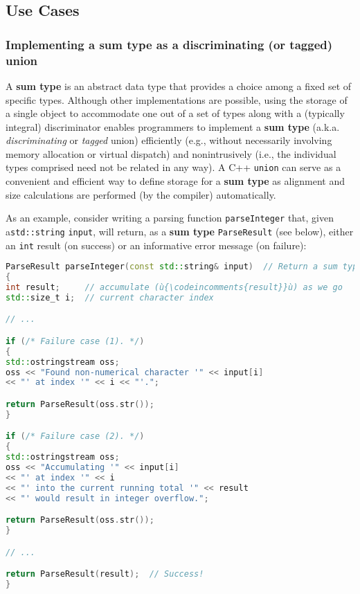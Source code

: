 \subsection[Use Cases]{Use Cases}\label{unrestrictedunion-use-cases}

\subsubsection[Implementing a \textbf{sum type}\glossary{sum type} as a discriminating (or tagged) \tt{union}]{Implementing a \textbf{sum type} as a discriminating (or tagged) {\ParaCode union}}\label{implementing-a-sum-type-as-a-discriminating-(or-tagged)-union}

A \textbf{sum type} is an abstract data type that provides a choice
among a fixed set of specific types. Although other implementations are
possible, using the storage of a single object to accommodate one out of
a set of types along with a (typically integral) discriminator enables
programmers to implement a \textbf{sum type} (a.k.a.
\emph{discriminating} or \emph{tagged} union) efficiently (e.g., without
necessarily involving memory allocation or virtual dispatch) and
nonintrusively (i.e., the individual types comprised need not be related
in any way). A C++ \texttt{union} can serve as a convenient and
efficient way to define storage for a \textbf{sum type} as alignment and
size calculations are performed (by the compiler) automatically.

As an example, consider writing a parsing function \texttt{parseInteger}
that, given a\linebreak[4] \texttt{std::string} \texttt{input}, will return, as a
\textbf{sum type} \texttt{ParseResult} (see below), either an
\texttt{int} result (on success) or an informative error message
(on failure):

\begin{lstlisting}[language=C++]
ParseResult parseInteger(const std::string& input)  // Return a sum type.
{
int result;     // accumulate (ù{\codeincomments{result}}ù) as we go
std::size_t i;  // current character index

// ...

if (/* Failure case (1). */)
{
std::ostringstream oss;
oss << "Found non-numerical character '" << input[i]
<< "' at index '" << i << "'.";

return ParseResult(oss.str());
}

if (/* Failure case (2). */)
{
std::ostringstream oss;
oss << "Accumulating '" << input[i]
<< "' at index '" << i
<< "' into the current running total '" << result
<< "' would result in integer overflow.";

return ParseResult(oss.str());
}

// ...

return ParseResult(result);  // Success!
}
\end{lstlisting}

